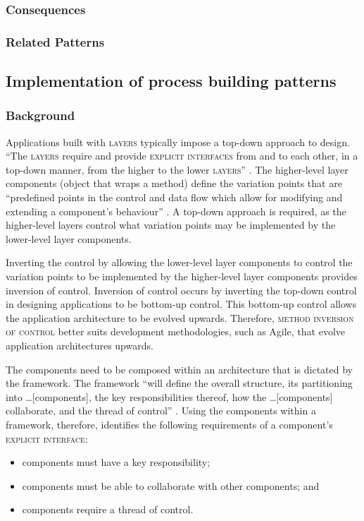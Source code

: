 \documentclass[prodmode]{style/acmlarge}
\begin{document}
\subsubsection*{Consequences}

\subsubsection*{Related Patterns}



\subsection{Implementation of process building patterns}

\subsubsection*{Background}

Applications built with \textsc{layers} typically impose a top-down approach to
design.  ``The \textsc{layers} require and provide \textsc{explicit interfaces}
from and to each other, in a top-down manner, from the higher to the lower
\textsc{layers}'' \cite[p. 11]{ioc}.  The higher-level layer components (object
that wraps a method) define the variation points that are ``predefined points in
the control and data flow which allow for modifying and extending a component's
behaviour'' \cite[p. 5]{ioc}.  A top-down approach is required, as the
higher-level layers control what variation points may be implemented by the
lower-level layer components.

Inverting the control by allowing the lower-level layer components to control the
variation points to be implemented by the higher-level layer components provides
inversion of control.  Inversion of control occurs by inverting the top-down
control in designing applications to be bottom-up control.  This bottom-up
control allows the application architecture to be evolved upwards. Therefore,
\textsc{method inversion of control} better suits development methodologies, such as
Agile, that evolve application architectures upwards.

The components need to be composed within an architecture that is dictated by
the framework.  The framework ``will define the overall structure, its
partitioning into \ldots [components], the key responsibilities thereof, how the
\ldots [components] collaborate, and the thread of control'' \cite[p.26]{gof}.
Using the components within a framework, therefore, identifies the following
requirements of a component's \textsc{explicit interface}:
\begin{itemize}
  \item components must have a key responsibility;
  \item components must be able to collaborate with other components; and
  \item components require a thread of control.
\end{itemize}
\end{document}
